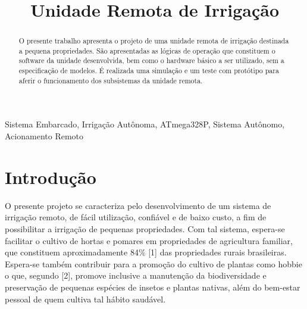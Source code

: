 \documentclass[conference]{IEEEtran}
\begin{document}
\title{Unidade Remota de Irrigação\\}

\author{
}

\maketitle

\begin{abstract}

O presente trabalho apresenta o projeto de uma unidade remota de irrigação destinada a pequena propriedades. São apresentadas as lógicas de operação que constituem o software da unidade desenvolvida, bem como o hardware básico a ser utilizado, sem a especificação de modelos. É realizada uma simulação e um teste com protótipo para aferir o funcionamento dos subsistemas da unidade remota.

\end{abstract}

\begin{IEEEkeywords}
Sistema Embarcado, Irrigação Autônoma, ATmega328P, Sistema Autônomo, Acionamento Remoto
\end{IEEEkeywords}

\section{Introdução}

O presente projeto se caracteriza pelo desenvolvimento de um sistema de irrigação remoto, de fácil utilização, confiável e de baixo custo, a fim de possibilitar a irrigação de pequenas propriedades. Com tal sistema, espera-se facilitar o cultivo de hortas e pomares em propriedades de agricultura familiar, que constituem aproximadamente 84\% [1] das propriedades rurais brasileiras. Espera-se também contribuir para a promoção do cultivo de plantas como hobbie o que, segundo [2], promove inclusive a manutenção da biodiversidade e preservação de pequenas espécies de insetos e plantas nativas, além do bem-estar pessoal de quem cultiva tal hábito saudável.
\end{document}
